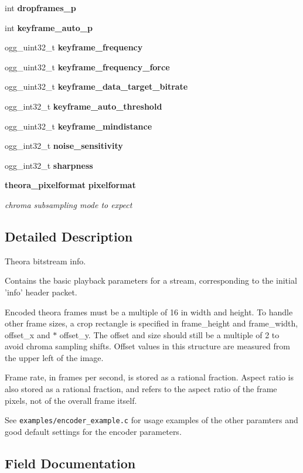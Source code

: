 \begin{DoxyCompactItemize}
int {\bf dropframes\-\_\-p}
\item 
int {\bf keyframe\-\_\-auto\-\_\-p}
\item 
ogg\-\_\-uint32\-\_\-t {\bf keyframe\-\_\-frequency}
\item 
ogg\-\_\-uint32\-\_\-t {\bf keyframe\-\_\-frequency\-\_\-force}
\item 
ogg\-\_\-uint32\-\_\-t {\bf keyframe\-\_\-data\-\_\-target\-\_\-bitrate}
\item 
ogg\-\_\-int32\-\_\-t {\bf keyframe\-\_\-auto\-\_\-threshold}
\item 
ogg\-\_\-uint32\-\_\-t {\bf keyframe\-\_\-mindistance}
\item 
ogg\-\_\-int32\-\_\-t {\bf noise\-\_\-sensitivity}
\item 
ogg\-\_\-int32\-\_\-t {\bf sharpness}
\item 
{\bf theora\-\_\-pixelformat} {\bf pixelformat}
\begin{DoxyCompactList}\small\item\em chroma subsampling mode to expect \end{DoxyCompactList}\end{DoxyCompactItemize}


\subsection{Detailed Description}
Theora bitstream info. 

Contains the basic playback parameters for a stream, corresponding to the initial 'info' header packet.

Encoded theora frames must be a multiple of 16 in width and height. To handle other frame sizes, a crop rectangle is specified in frame\-\_\-height and frame\-\_\-width, offset\-\_\-x and $\ast$ offset\-\_\-y. The offset and size should still be a multiple of 2 to avoid chroma sampling shifts. Offset values in this structure are measured from the upper left of the image.

Frame rate, in frames per second, is stored as a rational fraction. Aspect ratio is also stored as a rational fraction, and refers to the aspect ratio of the frame pixels, not of the overall frame itself.

See {\tt examples/encoder\-\_\-example.\-c} for usage examples of the other paramters and good default settings for the encoder parameters. 

\subsection{Field Documentation}
